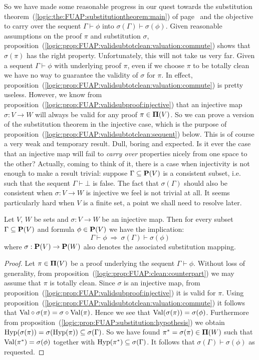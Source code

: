 So we have made some reasonable progress in our quest towards the
substitution theorem~(\ref{logic:the:FUAP:substitutiontheorem:main})
of page~\pageref{logic:the:FUAP:substitutiontheorem:main} and the
objective to carry over the sequent $\Gamma\vdash\phi$ into
$\sigma(\Gamma)\vdash\sigma(\phi)$. Given reasonable assumptions on
the proof $\pi$ and substitution $\sigma$,
proposition~(\ref{logic:prop:FUAP:validsubtotclean:valuation:commute})
shows that $\sigma(\pi)$ has the right property. Unfortunately, this
will not take us very far. Given a sequent $\Gamma\vdash\phi$ with
underlying proof $\pi$, even if we choose $\pi$ to be totally clean
we have no way to guarantee the validity of $\sigma$ for $\pi$. In
effect,
proposition~(\ref{logic:prop:FUAP:validsubtotclean:valuation:commute})
is pretty useless. However, we know from
proposition~(\ref{logic:prop:FUAP:validsubproof:injective}) that an
injective map $\sigma:V\to W$ will always be valid for any proof
$\pi\in\mbox{${\bf\Pi}(V)$}$. So we can prove a version of the substitution theorem
in the injective case, which is the purpose of
proposition~(\ref{logic:prop:FUAP:validsubtotclean:sequent}) below.
This is of course a very weak and temporary result. Dull, boring and
expected. Is it ever the case that an injective map will fail to
{\em carry over} properties nicely from one space to the other?
Actually, coming to think of it, there is a case when injectivity is
not enough to make a result trivial: suppose $\Gamma\subseteq\mbox{${\bf P}(V)$}$ is
a consistent subset, i.e. such that the sequent $\Gamma\vdash\bot$
is false. The fact that $\sigma(\Gamma)$ should also be consistent
when $\sigma:V\to W$ is injective we feel is not trivial at all. It
seems particularly hard when $V$ is a finite set, a point we shall
need to resolve later.

\begin{prop}\label{logic:prop:FUAP:validsubtotclean:sequent}
Let $V$, $W$ be sets and $\sigma:V\to W$ be an injective map. Then
for every subset $\Gamma\subseteq\mbox{${\bf P}(V)$}$ and formula $\phi\in\mbox{${\bf P}(V)$}$ we
have the implication:
    \[
    \Gamma\vdash\phi\ \Rightarrow\ \sigma(\Gamma)\vdash\sigma(\phi)
    \]
where $\sigma:\mbox{${\bf P}(V)$}\to{\bf P}(W)$ also denotes the associated
substitution mapping.
\end{prop}
\begin{proof}
Let $\pi\in\mbox{${\bf\Pi}(V)$}$ be a proof underlying the sequent
$\Gamma\vdash\phi$. Without loss of generality, from
proposition~(\ref{logic:prop:FUAP:clean:counterpart}) we may assume
that $\pi$ is totally clean. Since $\sigma$ is an injective map,
from proposition~(\ref{logic:prop:FUAP:validsubproof:injective}) it
is valid for $\pi$. Using
proposition~(\ref{logic:prop:FUAP:validsubtotclean:valuation:commute})
it follows that $\mbox{\rm Val}\circ\sigma(\pi)=\sigma\circ\mbox{\rm Val}(\pi)$. Hence
we see that $\mbox{\rm Val}(\sigma(\pi))=\sigma(\phi)$. Furthermore from
proposition~(\ref{logic:prop:FUAP:substitution:hypothesis}) we
obtain $\mbox{\rm Hyp}(\sigma(\pi))=\sigma(\mbox{\rm Hyp}(\pi))\subseteq\sigma(\Gamma)$.
So we have found $\pi^{*}=\sigma(\pi)\in{\bf\Pi}(W)$ such that
$\mbox{\rm Val}(\pi^{*})=\sigma(\phi)$ together with
$\mbox{\rm Hyp}(\pi^{*})\subseteq\sigma(\Gamma)$. It follows that
$\sigma(\Gamma)\vdash\sigma(\phi)$ as requested.
\end{proof}
